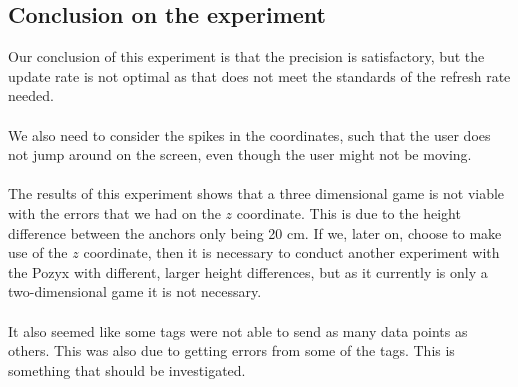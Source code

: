 \subsection{Conclusion on the experiment}
Our conclusion of this experiment is that the precision is satisfactory, but the update rate is not optimal as that does not meet the standards of the refresh rate needed.
\\\\
We also need to consider the spikes in the coordinates, such that the user does not jump around on the screen, even though the user might not be moving.
\\\\
The results of this experiment shows that a three dimensional game is not viable with the errors that we had on the $z$ coordinate. 
This is due to the height difference between the anchors only being 20 cm.
If we, later on, choose to make use of the $z$ coordinate, then it is necessary to conduct another experiment with the Pozyx with different, larger height differences, but as it currently is only a two-dimensional game it is not necessary.
\\\\
It also seemed like some tags were not able to send as many data points as others.
This was also due to getting errors from some of the tags.
This is something that should be investigated.
